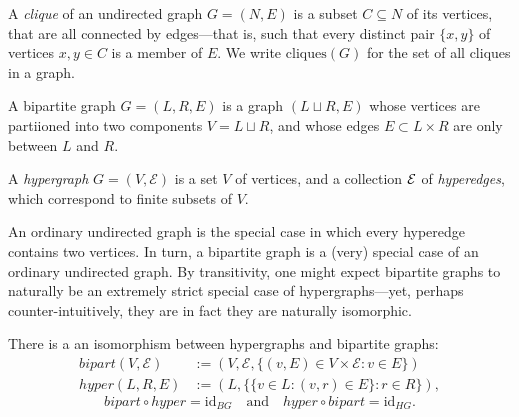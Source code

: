 A \emph{clique} of an undirected graph $G = (N,E)$ is a subset $C \subseteq N$ of its vertices, that are all connected by edges---that is, such that every distinct pair $\{x,y\}$ of vertices $x,y \in C$ is a member of $E$.  We write $\mathrm{cliques}(G)$ for the set of all cliques in a graph. 

\begin{defn}
    A bipartite graph $G = (L, R, E)$ is a graph $(L \sqcup R, E)$ whose
    vertices are partiioned into two components $V = L \sqcup R$, 
    and whose edges $E \subset L \times R$ are only between $L$ and $R$. 
\end{defn}



\begin{defn}
    A \emph{hypergraph} $G = (V, \mathcal E)$ is a set $V$ of vertices,
    and a collection $\mathcal E$ of \emph{hyperedges}, which correspond to finite
    subsets of $V$. 
\end{defn}

An ordinary undirected graph is the special case in which every hyperedge contains two vertices.
In turn, a bipartite graph is a (very) special case of an ordinary undirected graph.
By transitivity, one might expect bipartite graphs to naturally be an extremely strict special case of hypergraphs---yet, perhaps counter-intuitively, they are in fact they are naturally isomorphic. 

\begin{prop} 
There is a 
an isomorphism
between hypergraphs and bipartite graphs:
\def\bigr{\mathit{bipart}}
\def\hygr{\mathit{hyper}}
\begin{align*}
    \bigr(V, \mathcal E) &:=  (V, \mathcal E, \{(v, E) \in V \times \mathcal E : v \in E \} ) \\
    \hygr(L, R, E) &:= (L, \{\{v \in L : (v,r) \in E\} : r \in R\}),
\end{align*}    
    \[
        \bigr \circ \hygr = \mathrm{id}_{BG}
        \quad\text{and}\quad
        \hygr \circ \bigr = \mathrm{id}_{HG}.
    \]
\end{prop}

